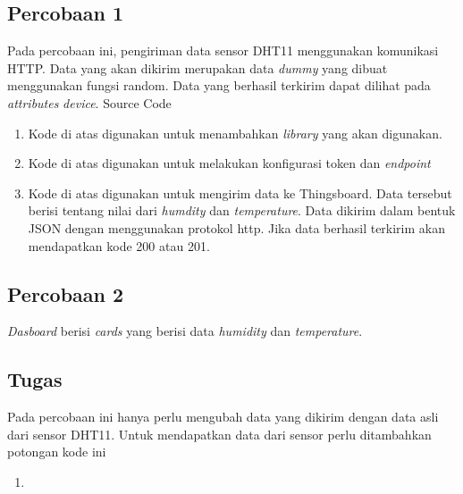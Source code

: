 \documentclass{class}
\begin{document}
  \subsection{Percobaan 1}
  Pada percobaan ini, pengiriman data sensor DHT11 menggunakan komunikasi HTTP.
  Data yang akan dikirim merupakan data \emph{dummy} yang dibuat menggunakan fungsi random.
  Data yang berhasil terkirim dapat dilihat pada \emph{attributes} \emph{device}.
  Source Code
    \begin{enumerate}
      \item 
      Kode di atas digunakan untuk menambahkan \emph{library} yang akan digunakan. \\
      \item 
      Kode di atas digunakan untuk melakukan konfigurasi token dan \emph{endpoint}\\
      \item 
      Kode di atas digunakan untuk mengirim data ke Thingsboard. 
      Data tersebut berisi tentang nilai dari \emph{humdity} dan \emph{temperature}.
      Data dikirim dalam bentuk JSON dengan menggunakan protokol http.
      Jika data berhasil terkirim akan mendapatkan kode 200 atau 201. \\
    \end{enumerate}
  \subsection{Percobaan 2}
  \emph{Dasboard} berisi \emph{cards} yang berisi data \emph{humidity} dan \emph{temperature}. 
  \subsection{Tugas}
  Pada percobaan ini hanya perlu mengubah data yang dikirim dengan data asli dari sensor DHT11.
  Untuk mendapatkan data dari sensor perlu ditambahkan potongan kode ini
  
  \begin{enumerate}
    \item 
  \end{enumerate}
\end{document}
